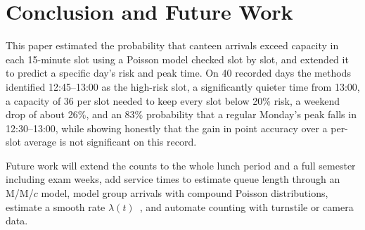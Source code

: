 \documentclass[conference,a4paper]{IEEEtran}
\begin{document}
\section{Conclusion and Future Work}\label{sec:conclusion}
This paper estimated the probability that canteen arrivals exceed capacity in each 15-minute slot using a Poisson
model checked slot by slot, and extended it to predict a specific day's risk and peak time. On 40 recorded days the
methods identified 12:45--13:00 as the high-risk slot, a significantly quieter time from 13:00, a capacity of 36 per
slot needed to keep every slot below 20\% risk, a weekend drop of about 26\%, and an 83\% probability that a regular Monday's
peak falls in 12:30--13:00, while showing honestly that the gain in point accuracy over a per-slot average is not
significant on this record.

Future work will extend the counts to the whole lunch period and a full semester including exam weeks, add service
times to estimate queue length through an M/M/$c$ model, model group arrivals with compound Poisson distributions,
estimate a smooth rate $\lambda(t)$~\cite{leemis1991}, and automate counting with turnstile or camera data.



\end{document}
